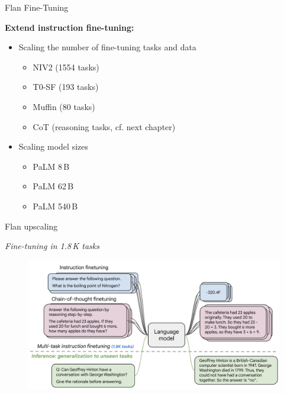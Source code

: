\begin{vbframe}{Flan Fine-Tuning}

\vfill

\textbf{Extend instruction fine-tuning:} \vskip3mm

\begin{itemize}
\item Scaling the number of fine-tuning tasks and data
    \begin{itemize}
    \item NIV2 (1554 tasks)
    \item T0-SF (193 tasks)
    \item Muffin (80 tasks)
    \item CoT (reasoning tasks, cf. next chapter)
    \end{itemize}
\item Scaling model sizes
    \begin{itemize}
    \item PaLM 8\,B
    \item PaLM 62\,B
    \item PaLM 540\,B
    \end{itemize}
\end{itemize}

\vfill

\end{vbframe}


\begin{vbframe}{Flan upscaling}

\vfill

\textit{Fine-tuning in 1.8\,K tasks}
    
\begin{figure}
    \centering
    \includegraphics{figure/scaling_up_paradigms.png}\\
\end{figure}

\vfill

\end{vbframe}

